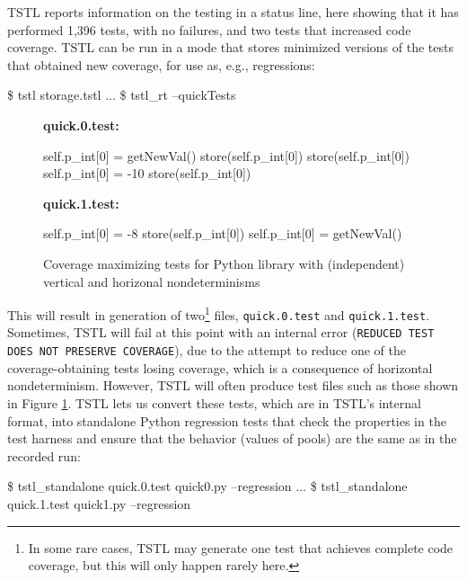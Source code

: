 TSTL reports information on the testing in a status line, here showing
that it has performed 1,396 tests, with no failures, and two tests
that increased code coverage.  TSTL can be run in a mode that stores
minimized versions of the tests that obtained new coverage, for use
as, e.g., regressions:

{\scriptsize
\begin{code}
 \$ tstl storage.tstl
 ...
 \$ tstl\_rt --quickTests
\end{code}
}

\begin{figure}
 {\scriptsize
{\bf quick.0.test:}
\begin{code}
self.p\_int[0] = getNewVal() 
store(self.p\_int[0]) 
store(self.p\_int[0]) 
self.p\_int[0] = -10 
store(self.p\_int[0]) 
\end{code}
\vspace{0.1in}
{\bf quick.1.test:}
\begin{code}
self.p\_int[0] = -8
store(self.p\_int[0]) 
self.p\_int[0] = getNewVal() 
\end{code}
}
\caption{Coverage maximizing tests for Python library with (independent) vertical and
  horizonal nondeterminisms}
\label{fig:simpleexampletests}
\end{figure}

This will result in generation of two\footnote{In some rare cases,
  TSTL may generate one test that achieves complete code coverage, but
  this will only happen rarely here.} files, {\tt quick.0.test} and
{\tt quick.1.test}.  Sometimes, TSTL will fail at this point with an internal error
({\tt REDUCED TEST DOES NOT PRESERVE COVERAGE}), due to the attempt to reduce one of the coverage-obtaining
tests losing coverage, which is a consequence of horizontal
nondeterminism.  However, TSTL will often produce
test files such as those shown in Figure
\ref{fig:simpleexampletests}.  TSTL lets us convert these tests, which
are in TSTL's internal format, into standalone Python regression tests
that check the properties in the test harness and ensure that the
behavior (values of pools) are the same as in the recorded run:

{\scriptsize
\begin{code}
 \$ tstl\_standalone quick.0.test quick0.py --regression
 ...
 \$ tstl\_standalone quick.1.test quick1.py --regression
\end{code}
}

